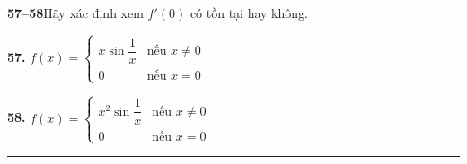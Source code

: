 \begin{minipage}[t]{0.30\linewidth}
  \vspace{1.2em}
  {\color{stewartblue}\textbf{57--58}}\quad Hãy xác định xem $f'(0)$ có tồn tại hay không.

  \vspace{0.8em}
  \textbf{57.} $f(x) = \begin{cases} x \sin \dfrac{1}{x} & \text{nếu } x \neq 0 \\[6pt] 0 & \text{nếu } x = 0 \end{cases}$

  \vspace{1.1em}
  \textbf{58.} $f(x) = \begin{cases} x^2 \sin \dfrac{1}{x} & \text{nếu } x \neq 0 \\[6pt] 0 & \text{nếu } x = 0 \end{cases}$

  \vspace{1.4em}
  {\color{stewartblue}\rule{\linewidth}{0.8pt}}
\end{minipage}%
\hfill

